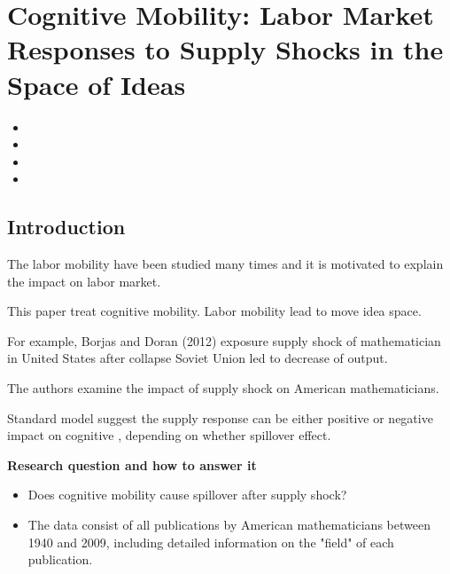 \documentclass[../root]{subfiles}
\begin{document}
    \chapter{Cognitive Mobility: Labor Market Responses to Supply Shocks in the Space of Ideas}

    \begin{shortsummary}
        \begin{itemize}
            \item {} 
            \item {}
            \item {}
            \item {}
        \end{itemize}
    \end{shortsummary}

    \section{Introduction}
   The labor mobility  have been studied  many times and it is motivated to explain the impact on labor market.    
   
   This paper treat cognitive mobility. Labor mobility lead to move idea space. 
   
   For example, Borjas and Doran (2012) exposure supply shock of mathematician in United States after collapse Soviet Union led to decrease of output.
   
   The authors examine the impact of supply shock on American mathematicians.
   
   Standard model suggest the supply  response can be either positive or negative impact on cognitive , depending on whether spillover effect. 
   
   {\bf Research question and how to answer it}
   \begin{itemize}
       \item Does cognitive mobility cause spillover after supply shock?
       \item The data consist of all publications by American mathematicians between 1940 and 2009, including detailed information on the "field" of each publication.
   \end{itemize}
   
\end{document}
